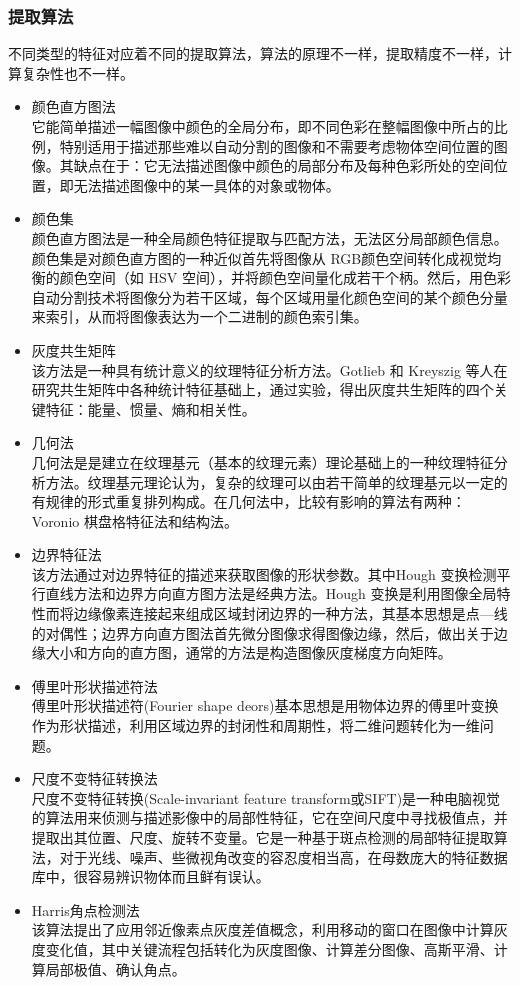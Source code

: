 \subsubsection{提取算法}
不同类型的特征对应着不同的提取算法，算法的原理不一样，提取精度不一样，计算复杂性也不一样。
\begin{itemize}
\item 颜色直方图法\\它能简单描述一幅图像中颜色的全局分布，即不同色彩在整幅图像中所占的比例，特别适用于描述那些难以自动分割的图像和不需要考虑物体空间位置的图像。其缺点在于：它无法描述图像中颜色的局部分布及每种色彩所处的空间位置，即无法描述图像中的某一具体的对象或物体。
\item 颜色集 \\颜色直方图法是一种全局颜色特征提取与匹配方法，无法区分局部颜色信息。颜色集是对颜色直方图的一种近似首先将图像从 RGB颜色空间转化成视觉均衡的颜色空间（如 HSV 空间），并将颜色空间量化成若干个柄。然后，用色彩自动分割技术将图像分为若干区域，每个区域用量化颜色空间的某个颜色分量来索引，从而将图像表达为一个二进制的颜色索引集。
\item 灰度共生矩阵\\ 该方法是一种具有统计意义的纹理特征分析方法。Gotlieb 和 Kreyszig 等人在研究共生矩阵中各种统计特征基础上，通过实验，得出灰度共生矩阵的四个关键特征：能量、惯量、熵和相关性。
\item 几何法\\几何法是是建立在纹理基元（基本的纹理元素）理论基础上的一种纹理特征分析方法。纹理基元理论认为，复杂的纹理可以由若干简单的纹理基元以一定的有规律的形式重复排列构成。在几何法中，比较有影响的算法有两种：Voronio 棋盘格特征法和结构法。
\item 边界特征法\\该方法通过对边界特征的描述来获取图像的形状参数。其中Hough 变换检测平行直线方法和边界方向直方图方法是经典方法。Hough 变换是利用图像全局特性而将边缘像素连接起来组成区域封闭边界的一种方法，其基本思想是点—线的对偶性；边界方向直方图法首先微分图像求得图像边缘，然后，做出关于边缘大小和方向的直方图，通常的方法是构造图像灰度梯度方向矩阵。
\item 傅里叶形状描述符法\\傅里叶形状描述符(Fourier shape deors)基本思想是用物体边界的傅里叶变换作为形状描述，利用区域边界的封闭性和周期性，将二维问题转化为一维问题。
\item 尺度不变特征转换法\\尺度不变特征转换(Scale-invariant feature transform或SIFT)是一种电脑视觉的算法用来侦测与描述影像中的局部性特征，它在空间尺度中寻找极值点，并提取出其位置、尺度、旋转不变量。它是一种基于斑点检测的局部特征提取算法，对于光线、噪声、些微视角改变的容忍度相当高，在母数庞大的特征数据库中，很容易辨识物体而且鲜有误认。
\item Harris角点检测法\\该算法提出了应用邻近像素点灰度差值概念，利用移动的窗口在图像中计算灰度变化值，其中关键流程包括转化为灰度图像、计算差分图像、高斯平滑、计算局部极值、确认角点。
\end{itemize}

